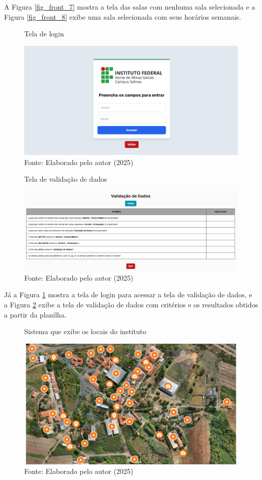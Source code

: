 A Figura \ref{fig_front_7} mostra a tela das salas com nenhuma sala selecionada e a Figura \ref{fig_front_8} exibe uma sala selecionada com seus horários semanais.

\begin{figure}[htb]
    \centering
    \caption{Tela de login}
    \includegraphics[width=1\textwidth]{Figuras/front-9.png}
    \caption*{Fonte: Elaborado pelo autor (2025)}
    \label{fig_front_9}
\end{figure}

\begin{figure}[H]
    \centering
    \caption{Tela de validação de dados}
    \includegraphics[width=1\textwidth]{Figuras/front-10.png}
    \caption*{Fonte: Elaborado pelo autor (2025)}
    \label{fig_front_10}
\end{figure}

Já a Figura \ref{fig_front_9} mostra a tela de login para acessar a tela de validação de dados, e a Figura \ref{fig_front_10} exibe a tela de validação de dados com critérios e os resultados obtidos a partir da planilha.

\begin{figure}[htb]
    \centering
    \caption{Sistema que exibe os locais do instituto}
    \includegraphics[width=1\textwidth]{Figuras/front-11.png}
    \caption*{Fonte: Elaborado pelo autor (2025)}
    \label{fig_front_11}
\end{figure}

